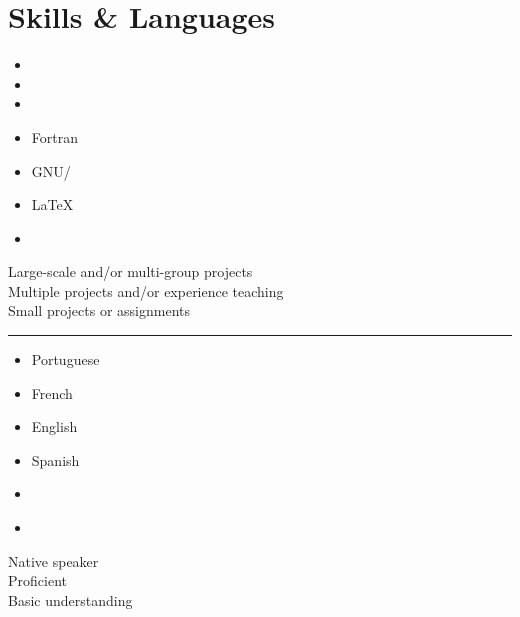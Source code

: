 \documentclass[10pt]{article}
\begin{document}
  \begin{minipage}{\linewidth}
    \newcommand{\skills}[2]{
      \item #2 #1
    }
    \section{Skills \& Languages}
      \begin{multicols}{4}
        \raggedcolumns
        \begin{itemize}
          \renewcommand{\labelitemi}{}
          \renewcommand{\skill}{\textnormal}
          \setlength{\itemsep}{1pt}
          \setlength{\parskip}{0pt}
          \setlength{\parsep}{0pt}

          \skills{\python}{\threeskill}
          \skills{\ccpp}{\twoskill}
          \skills{\git}{\threeskill}
          \skills{Fortran}{\threeskill}
          \skills{GNU/\linux}{\threeskill}
          \skills{\LaTeX}{\twoskill}
          \skills{\matlab}{\oneskill}

        \end{itemize}
      \end{multicols}
      \begin{footnotesize}
        \raggedleft
          Large-scale and/or multi-group projects ~ \threeskill \\
          Multiple projects and/or experience teaching \twoskill \\
          Small projects or assignments \oneskill \\
      \end{footnotesize}

      \begin{center}
      \noindent\rule{8cm}{0.4pt}
      \end{center}

      \begin{multicols}{4}
        \begin{itemize}
        \renewcommand{\labelitemi}{}
        \setlength{\itemsep}{1pt}
        \setlength{\parskip}{0pt}
        \setlength{\parsep}{0pt}

        \skills{Portuguese}{\threeskill}
        \skills{French}{\oneskill}
        \skills{English}{\twoskill}
        \skills{Spanish}{\oneskill}
        \skills{~}{}
        \skills{~}{}
        \end{itemize}
      \end{multicols}
      \begin{minipage}{0.5\linewidth}
        \begin{footnotesize}
        \raggedleft
           Native speaker \threeskill \\
          Proficient \twoskill \\
          Basic understanding \oneskill \\
        \end{footnotesize}
      \end{minipage}

  \end{minipage}
\end{document}
